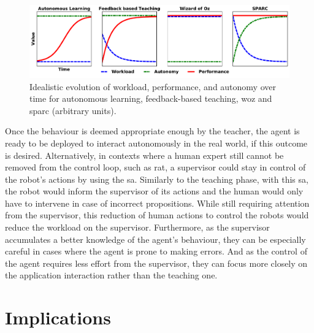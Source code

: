 \begin{figure}[ht]
	\includegraphics[width=1\linewidth]{concept.pdf}
	\centering
	\caption{Idealistic evolution of workload, performance, and autonomy over time for autonomous learning, feedback-based teaching, \gls{woz} and \gls{sparc} (arbitrary units).}
	\label{fig:concept}
\end{figure}
Once the behaviour is deemed appropriate enough by the teacher, the agent is ready to be deployed to interact autonomously in the real world, if this outcome is desired. Alternatively, in contexts where a human expert still cannot be removed from the control loop, such as \gls{rat}, a supervisor could stay in control of the robot's actions by using the \gls{sa}. Similarly to the teaching phase, with this \gls{sa}, the robot would inform the supervisor of its actions and the human would only have to intervene in case of incorrect propositions. While still requiring attention from the supervisor, this reduction of human actions to control the robots would reduce the workload on the supervisor. Furthermore, as the supervisor accumulates a better knowledge of the agent's behaviour, they can be especially careful in cases where the agent is prone to making errors. And as the control of the agent requires less effort from the supervisor, they can focus more closely on the application interaction rather than the teaching one. 

\section{Implications}

